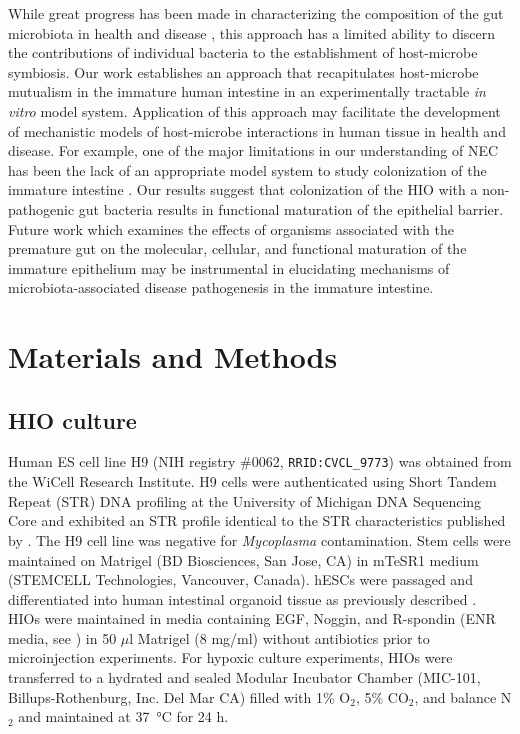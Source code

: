 \documentclass[9pt,lineo]{elife}
\begin{document}
While great progress has been made in characterizing the composition of the gut microbiota in health and disease \citep{Shreiner:2015,Costello:2012}, this approach has a limited ability to discern the contributions of individual bacteria to the establishment of host-microbe symbiosis. Our work establishes an approach that recapitulates host-microbe mutualism in the immature human intestine in an experimentally tractable \emph{in vitro} model system. Application of this approach may facilitate the development of mechanistic models of host-microbe interactions in human tissue in health and disease. For example, one of the major limitations in our understanding of NEC has been the lack of an appropriate model system to study colonization of the immature intestine \citep{Neu:2011,Balimane:2005,Tanner:2015,Nguyen:2015}. Our results suggest that colonization of the HIO with a non-pathogenic gut bacteria results in functional maturation of the epithelial barrier. Future work which examines the effects of organisms associated with the premature gut \citep{Morrow:2013,Greenwood:2014,Ward:2016} on the molecular, cellular, and functional maturation of the immature epithelium may be instrumental in elucidating mechanisms of microbiota-associated disease pathogenesis in the immature intestine.

\section*{{\bfseries\sffamily } Materials and Methods}
\label{sec:orgheadline27}

\subsection*{{\bfseries\sffamily } HIO culture}
\label{sec:orgheadline14}
Human ES cell line H9 (NIH registry \#0062, \texttt{RRID:CVCL\_9773}) was obtained from the WiCell Research Institute. H9 cells were authenticated using Short Tandem Repeat (STR) DNA profiling \citep{Matsuo:1999} at the University of Michigan DNA Sequencing Core and exhibited an STR profile identical to the STR characteristics published by \cite{Josephson:2006}. The H9 cell line was negative for \emph{Mycoplasma} contamination. Stem cells were maintained on Matrigel (BD Biosciences, San Jose, CA) in mTeSR1 medium (STEMCELL Technologies, Vancouver, Canada). hESCs were passaged and differentiated into human intestinal organoid tissue as previously described \citep{Spence:2011,McCracken:2011}. HIOs were maintained in media containing EGF, Noggin, and R-spondin (ENR media, see \cite{McCracken:2011}) in 50 \(\mu\)l Matrigel (8 mg/ml) without antibiotics prior to microinjection experiments.
For hypoxic culture experiments, HIOs were transferred to a hydrated and sealed Modular Incubator Chamber (MIC-101, Billups-Rothenburg, Inc. Del Mar CA) filled with 1\% O\(_{\text{2}}\), 5\% CO\(_{\text{2}}\), and balance N\(_{\text{2}}\) and maintained at \SI{37}{\celsius} for 24 h.
\end{document}
